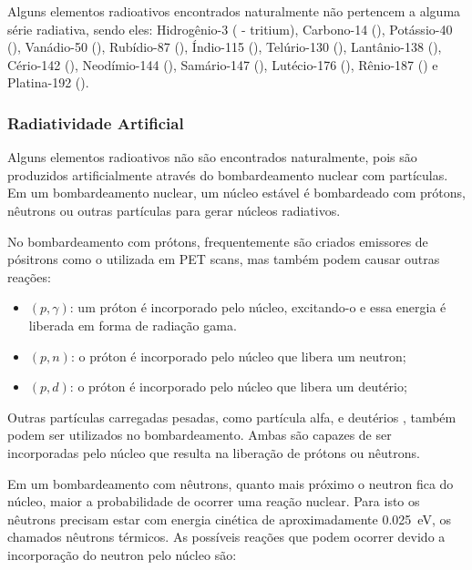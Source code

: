 \documentclass[11pt,a4paper]{article}
\begin{document}
    Alguns elementos radioativos encontrados naturalmente não pertencem a alguma série radiativa, sendo eles: Hidrogênio-3 ( - tritium),  Carbono-14 (), Potássio-40 (), Vanádio-50 (), Rubídio-87 (), Índio-115 (), Telúrio-130 (), Lantânio-138 (), Cério-142 (), Neodímio-144 (), Samário-147 (), Lutécio-176 (), Rênio-187 () e Platina-192 ().
            
\subsubsection*{Radiatividade Artificial}

    Alguns elementos radioativos não são encontrados naturalmente, pois são produzidos artificialmente através do bombardeamento nuclear com partículas. Em um bombardeamento nuclear, um núcleo estável é bombardeado com prótons, nêutrons ou outras partículas para gerar núcleos radiativos.

    No bombardeamento com prótons, frequentemente são criados emissores de pósitrons como o  utilizada em PET scans, mas também podem causar outras reações:

                    \begin{itemize}
                        \item $(p, \gamma)$: um próton é incorporado pelo núcleo, excitando-o e essa energia é liberada em forma de radiação gama.
                        \item $(p, n)$: o próton é incorporado pelo núcleo que libera um neutron;
                        \item $(p, d)$: o próton é incorporado pelo núcleo que libera um deutério;
                    \end{itemize}

    Outras partículas carregadas pesadas, como partícula alfa, e deutérios , também podem ser utilizados no bombardeamento. Ambas são capazes de ser incorporadas pelo núcleo que resulta na  liberação de prótons ou nêutrons.

    Em um bombardeamento com nêutrons, quanto mais próximo o neutron fica do núcleo, maior a probabilidade de ocorrer uma reação nuclear. Para isto os nêutrons precisam estar com energia cinética de aproximadamente \qty{0.025}{eV}, os chamados nêutrons térmicos. As possíveis reações que podem ocorrer devido a incorporação do neutron pelo núcleo são:
\end{document}
